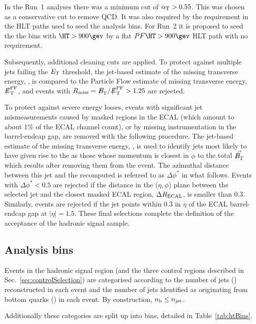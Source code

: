 In the Run~1 analyses there was a minimum cut of $\alpha_{\text{T}}>0.55$. This was chosen
as a conservative cut to remove QCD. It was also required
by the \alphat requirement in the HLT paths used to seed the analysis bins. For
Run~2 it is proposed to seed the the bins with $\HT>900\gev$ by a flat
$PF\HT>900\gev$ HLT path with no \alphat requirement.

Subsequently, additional cleaning cuts are applied. To protect against 
multiple jets failing the ${E_{\text T}}$ threshold, the
jet-based estimate of the missing transverse energy, \mht, is compared
to the Particle Flow estimate of missing transverse energy, $\pfmet$,
and events with $R_{\rm miss}=\mht/\pfmet > 1.25$ are rejected.

To protect against severe energy losses, events with significant jet
mismeasurements caused by masked regions in the ECAL (which amount to
about 1\% of the ECAL channel count), or by missing instrumentation in
the barrel-endcap gap, are removed with the following procedure. The
jet-based estimate of the missing transverse energy, \mht, is used to
identify jets most likely to have given rise to the \mht as those
whose momentum is closest in $\phi$ to the total $\vec{\mht}$ which
results after removing them from the event.  The azimuthal distance
between this jet and the recomputed \mht is referred to as
$\Delta\phi^*$ in what follows. Events with $\Delta\phi^* < 0.5$ are
rejected if the distance in the ($\eta,\phi$) plane between the
selected jet and the closest masked ECAL region, $\Delta R_{\rm
  ECAL}$, is smaller than 0.3. Similarly, events are rejected if the
jet points within 0.3 in $\eta$ of the ECAL barrel-endcap gap at
$|\eta| = 1.5$. These final selections complete the definition of the
acceptance of the hadronic signal sample.

\subsection{Analysis bins}

Events in the hadronic signal region (and the
three control regions described in Sec.~\ref{sec:controlSelection}) are
categorised according to the number of jets (\njet) reconstructed in
each event and the number of jets identified as originating from
bottom quarks (\nb) in each event. By construction, $n_{\text{b}} \leq n_{\text{jet}}$.

Additionally these categories are split up into \HT bins, detailed in 
Table~\ref{tab:htBins}.

